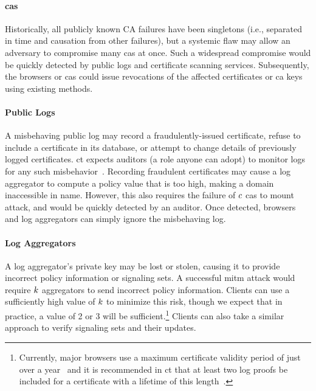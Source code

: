 \paragraph{\acp{ca}}
Historically, all publicly known CA failures have been singletons (i.e.,
separated in time and causation from other failures), but a systemic flaw may
allow an adversary to compromise many \acp{ca} at once. 
Such a widespread compromise would be quickly detected by public
logs and certificate scanning services. Subsequently, the browsers or \acp{ca}
could issue revocations of the affected certificates or \ac{ca} keys using
existing methods.

\paragraph{Public Logs}
A misbehaving public log may record a fraudulently-issued certificate, refuse
to include a certificate in its database, or attempt to change details of
previously logged certificates. \ac{ct} expects auditors (a role anyone can adopt) to
monitor logs for any such misbehavior~\cite{rfc6962}. 
Recording fraudulent certificates may cause a log
aggregator to compute a policy value that is too high, making a domain
inaccessible in \ac{name}. However, this also requires the failure of $c$
\acp{ca} to mount  attack, and would be quickly detected by an
auditor. Once detected, browsers and log aggregators can simply ignore the
misbehaving log.

\paragraph{Log Aggregators}
A log aggregator's private key may be lost or stolen, causing it to provide
incorrect policy information or signaling sets. A successful \ac{mitm} attack
would require $k$ aggregators to send incorrect policy information.
Clients can use a sufficiently high value of $k$ to minimize this risk,
though we expect that in practice, a value of 2 or 3 will be
sufficient.\footnote{Currently, major browsers use a maximum certificate
  validity period of just over a year~\cite{apple2020about} and it is
recommended in \ac{ct} that at least two log proofs be included for a
certificate with a lifetime of this length~\cite{apple2019apples}.} Clients can
also take a similar approach to verify signaling sets and their updates.

